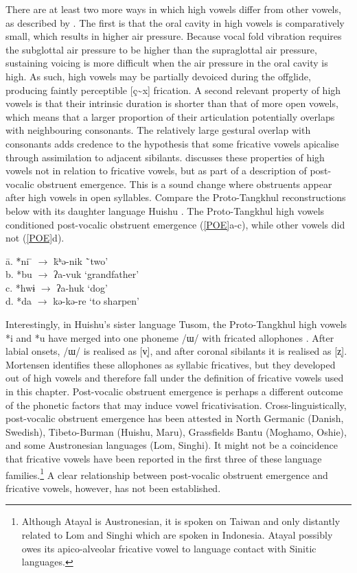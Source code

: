 \documentclass[output=paper,colorlinks,citecolor=brown,chinesefont]{langscibook}
\begin{document}
There are at least two more ways in which high vowels differ from other vowels, as described by \citet{Mortensen_2012}. The first is that the oral cavity in high vowels is comparatively small, which results in higher air pressure. Because vocal fold vibration requires the subglottal air pressure to be higher than the supraglottal air pressure, sustaining voicing is more difficult when the air pressure in the oral cavity is high. As such, high vowels may be partially devoiced during the offglide, producing faintly perceptible [ç{\textasciitilde}x] frication. A second relevant property of high vowels is that their intrinsic duration is shorter than that of more open vowels, which means that a larger proportion of their articulation potentially overlaps with neighbouring consonants. The relatively large gestural overlap with consonants adds credence to the hypothesis that some fricative vowels apicalise through assimilation to adjacent sibilants. \citet{Mortensen_2012} discusses these properties of high vowels not in relation to fricative vowels, but as part of a description of post-vocalic obstruent emergence. This is a sound change where obstruents appear after high vowels in open syllables. Compare the Proto-Tangkhul reconstructions below with its daughter language Huishu \citep[438--440]{Mortensen_2012}. The Proto-Tangkhul high vowels conditioned post-vocalic obstruent emergence (\ref{POE}a-c), while other vowels did not (\ref{POE}d).

\ea \label{POE}
    \begin{tabbing}
 \quad \=a. \quad \= *ni \quad \= $\rightarrow$ \quad \= kʰə-nik \quad \= `two' \\
 \> b. \> *bu \> $\rightarrow$ \> ʔa-vuk \> `grandfather' \\
 \>c. \> *hwɨ \> $\rightarrow$ \> ʔa-huk \> `dog' \\
 \> d. \> *da \> $\rightarrow$ \> kə-kə-re \> `to sharpen'
    \end{tabbing}
\z

Interestingly, in Huishu's sister language Tusom, the Proto-Tangkhul high vowels *i and *u have merged into one phoneme /ɯ/ with fricated allophones \citep[438]{Mortensen_2012}. After labial onsets, /ɯ/ is realised as [v̩], and after coronal sibilants it is realised as [z̩]. Mortensen identifies these allophones as syllabic fricatives, but they developed out of high vowels and therefore fall under the definition of fricative vowels used in this chapter. Post-vocalic obstruent emergence is perhaps a different outcome of the phonetic factors that may induce vowel fricativisation. Cross-linguistically, post-vocalic obstruent emergence has been attested in North Germanic (Danish, Swedish), Tibeto-Burman (Huishu, Maru), Grassfields Bantu (Moghamo, Oshie), and some Austronesian languages (Lom, Singhi). It might not be a coincidence that fricative vowels have been reported in the first three of these language families.\footnote{Although Atayal is Austronesian, it is spoken on Taiwan and only distantly related to Lom and Singhi which are spoken in Indonesia. Atayal possibly owes its apico-alveolar fricative vowel to language contact with Sinitic languages.} A clear relationship between post-vocalic obstruent emergence and fricative vowels, however, has not been established.
\end{document}
